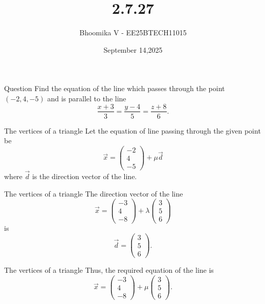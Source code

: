 \documentclass{beamer}
\begin{document}
\title 
{2.7.27}
\date{September 14,2025}


\author 
{Bhoomika V - EE25BTECH11015}




\frame{\titlepage}
\begin{frame}{Question}
Find the equation of the line which passes through the point $(-2,4,-5)$ and is parallel to the line
\[
\frac{x+3}{3} = \frac{y-4}{5} = \frac{z+8}{6}.
\]
\end{frame}

\begin{frame}{The vertices of a triangle}
Let the equation of line passing through the given point be
\[
\vec{x} = 
\begin{pmatrix}
-2 \\ 4 \\ -5
\end{pmatrix}
+ \mu \vec{d}
\]
where $\vec{d}$ is the direction vector of the line.  
\end{frame}


\begin{frame}{The vertices of a triangle}
The direction vector of the line 
\[
\vec{x} = 
\begin{pmatrix}
-3 \\ 4 \\ -8
\end{pmatrix}
+ \lambda
\begin{pmatrix}
3 \\ 5 \\ 6
\end{pmatrix}
\]
is
\[
\vec{d} = 
\begin{pmatrix}
3 \\ 5 \\ 6
\end{pmatrix}.
\tag{1}
\]
\end{frame}


\begin{frame}{The vertices of a triangle}
Thus, the required equation of the line is
\[
\vec{x} =
\begin{pmatrix}
-3 \\ 4 \\ -8
\end{pmatrix}
+ \mu 
\begin{pmatrix}
3 \\ 5 \\ 6
\end{pmatrix}.
\]
\end{frame}
\end{document}
